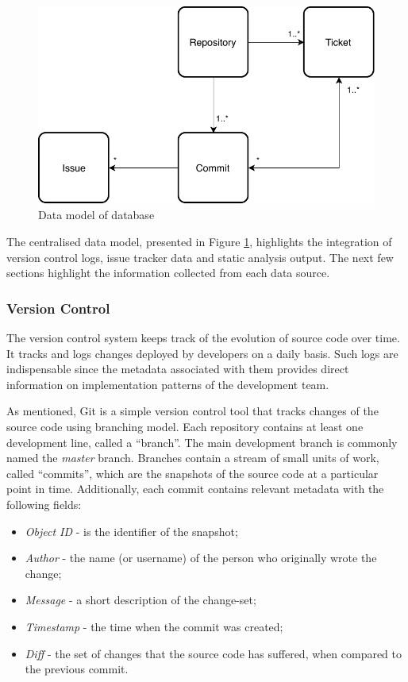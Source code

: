 \documentclass{mpaper}
\begin{document}
\begin{figure}
  \centering
  \includegraphics[width=\linewidth]{diagrams/data-model.pdf}
  \caption{Data model of database}
  \label{fig:data-model}
\end{figure}

The centralised data model, presented in Figure \ref{fig:data-model}, highlights
the integration of version control logs, issue tracker data and static analysis
output. The next few sections highlight the information collected from each data
source.

\subsubsection*{Version Control}
\label{version-control}

The version control system keeps track of the evolution of source code over
time. It tracks and logs changes deployed by developers on a daily basis. Such
logs are indispensable since the metadata associated with them provides direct
information on implementation patterns of the development team.

As mentioned, Git is a simple version control tool that tracks changes of the
source code using branching model. Each repository contains at least one
development line, called a ``branch''. The main development branch is commonly
named the \emph{master} branch. Branches contain a stream of small units of
work, called ``commits'', which are the snapshots of the source code at a
particular point in time. Additionally, each commit contains relevant metadata
with the following fields:

\begin{itemize}
  \item \emph{Object ID} - is the identifier of the snapshot;
  \item \emph{Author} - the name (or username) of the person who originally
  wrote the change;
  \item \emph{Message} - a short description of the change-set;
  \item \emph{Timestamp} - the time when the commit was created;
  \item \emph{Diff} - the set of changes that the source code has suffered, when
  compared to the previous commit. 
\end{itemize}
\end{document}
